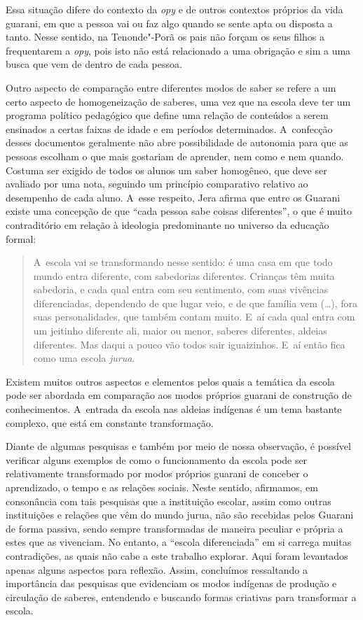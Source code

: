 Essa situação difere do contexto da \emph{opy} e de outros contextos próprios
da vida guarani, em que a pessoa vai ou faz algo quando se sente apta
ou disposta a tanto. Nesse sentido, na Tenonde"-Porã os pais não forçam
os seus filhos a frequentarem a \emph{opy}, pois isto não está relacionado a
uma obrigação e sim a uma busca que vem de dentro de cada pessoa.

Outro aspecto de comparação entre diferentes modos de saber se refere a
um certo aspecto de homogeneização de saberes, uma vez que na escola
deve ter um programa político pedagógico que define uma relação de
conteúdos a serem ensinados a certas faixas de idade e em períodos
determinados. A~confecção desses documentos geralmente não abre
possibilidade de autonomia para que as pessoas escolham o que mais
gostariam de aprender, nem como e nem quando. Costuma ser exigido de
todos os alunos um saber homogêneo, que deve ser avaliado por uma nota,
seguindo um princípio comparativo relativo ao desempenho de cada aluno.
A~esse respeito, Jera afirma que entre os Guarani existe uma concepção
de que ``cada pessoa sabe coisas diferentes'', o que é muito
contraditório em relação à ideologia predominante no universo da
educação formal: 

\begin{quote}
\noindent
A~escola vai se transformando nesse sentido: é uma casa em que todo
mundo entra diferente, com sabedorias diferentes. Crianças têm muita
sabedoria, e cada qual entra com seu sentimento, com suas vivências
diferenciadas, dependendo de que lugar veio, e de que família vem
(\ldots{}), fora suas personalidades, que também contam muito. E~aí cada
qual entra com um jeitinho diferente ali, maior ou menor, saberes
diferentes, aldeias diferentes. Mas daqui a pouco vão todos sair
iguaizinhos. E~aí então fica como uma escola \emph{jurua}.
\end{quote}

Existem muitos outros aspectos e elementos pelos quais a temática da
escola pode ser abordada em comparação aos modos próprios guarani de
construção de conhecimentos. A~entrada da escola nas aldeias indígenas
é um tema bastante complexo, que está em constante transformação.

Diante de algumas pesquisas e também por meio de nossa observação, é
possível verificar alguns exemplos de como o funcionamento da escola
pode ser relativamente transformado por modos próprios guarani de
conceber o aprendizado, o tempo e as relações sociais. Neste sentido,
afirmamos, em consonância com tais pesquisas que a instituição escolar,
assim como outras instituições e relações que vêm do mundo jurua, não
são recebidas pelos Guarani de forma passiva, sendo sempre
transformadas de maneira peculiar e própria a estes que as vivenciam.
No entanto, a ``escola diferenciada'' em si carrega muitas contradições,
as quais não cabe a este trabalho explorar. Aqui foram levantados
apenas alguns aspectos para reflexão. Assim, concluímos ressaltando a
importância das pesquisas que evidenciam os modos indígenas de produção
e circulação de saberes, entendendo e buscando formas criativas para
transformar a escola.

